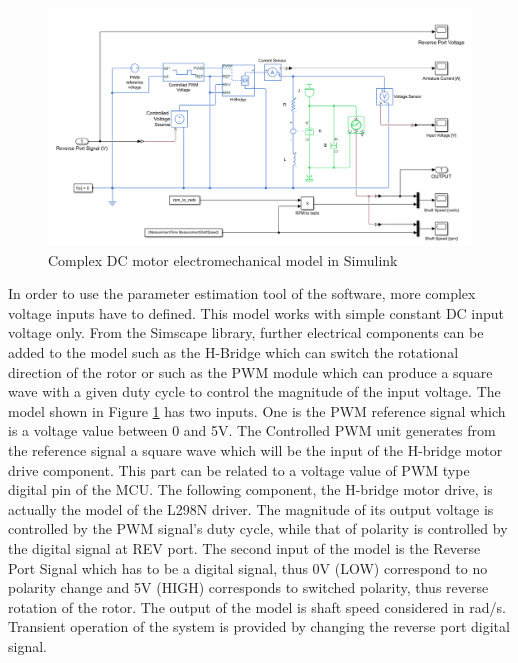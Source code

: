 \documentclass[12pt,english,twoside]{article}
\begin{document}
\begin{figure}[htb!]
	\centering
	\includegraphics[width=\textwidth]{figures/simulink_dc_motor_complex.png}
	\caption{Complex DC motor electromechanical model in Simulink}
	\label{simulink_dc_motor_complex}
\end{figure}
In order to use the parameter estimation tool of the software, more complex voltage inputs have to defined. This model works with simple constant DC input voltage only. From the Simscape library, further electrical components can be added to the model such as the H-Bridge which can switch the rotational direction of the rotor or such as the PWM module which can produce a square wave with a given duty cycle to control the magnitude of the input voltage. The model shown in Figure \ref{simulink_dc_motor_complex} has two inputs. One is the PWM reference signal which is a voltage value between 0 and 5V. The Controlled PWM unit generates from the reference signal a square wave which will be the input of the H-bridge motor drive component. This part can be related to a voltage value of PWM type digital pin of the MCU. The following component, the H-bridge motor drive, is actually the model of the L298N driver. The magnitude of its output voltage is controlled by the PWM signal's duty cycle, while that of polarity is controlled by the digital signal at REV port. The second input of the model is the Reverse Port Signal which has to be a digital signal, thus 0V (LOW) correspond to no polarity change and 5V (HIGH) corresponds to switched polarity, thus reverse rotation of the rotor. The output of the model is shaft speed considered in rad/s. Transient operation of the system is provided by changing the reverse port digital signal. 
\end{document}
